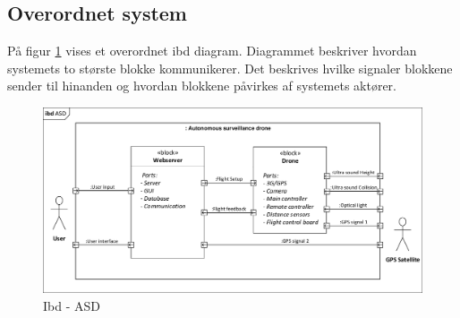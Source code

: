 \subsection{Overordnet system}

På figur \ref{fig:ibd_overordnet} vises et overordnet ibd diagram. Diagrammet beskriver hvordan systemets to største blokke kommunikerer. Det beskrives hvilke signaler blokkene sender til hinanden og hvordan blokkene påvirkes af systemets aktører. 

\begin{figure}[H]
\centering
\includegraphics[width=1\textwidth]{Billeder/IBD/ibd1_overordnet.pdf}
\vspace{-0.5cm}
\caption{Ibd - ASD}
\label{fig:ibd_overordnet}
\end{figure}

